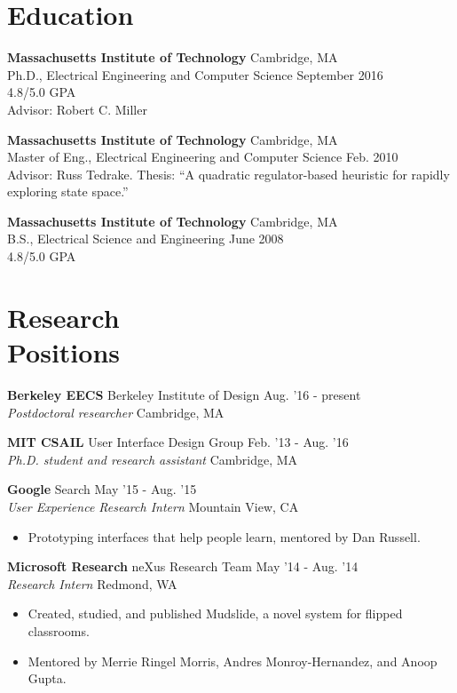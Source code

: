 \documentclass[margin]{res}
\begin{document}
\begin{resume}

\section{Education} 
{\bf Massachusetts Institute of Technology} \hfill Cambridge, MA \\
Ph.D., Electrical Engineering and Computer Science \hfill September 2016\\
4.8/5.0 GPA \\
Advisor: Robert C. Miller 

{\bf Massachusetts Institute of Technology} \hfill Cambridge, MA \\
Master of Eng., Electrical Engineering and Computer Science \hfill Feb. 2010 \\
Advisor: Russ Tedrake. Thesis: ``A quadratic regulator-based heuristic for rapidly exploring state space.''

{\bf Massachusetts Institute of Technology} \hfill Cambridge, MA \\
B.S., Electrical Science and Engineering \hfill June 2008 \\
4.8/5.0 GPA

\section{Research \\Positions}

{\bf Berkeley EECS} Berkeley Institute of Design \hfill Aug. '16 - present \\ 
{\it Postdoctoral researcher} \hfill Cambridge, MA 

{\bf MIT CSAIL} User Interface Design Group \hfill Feb. '13 - Aug. '16 \\ 
{\it Ph.D. student and research assistant} \hfill Cambridge, MA 

{\bf Google} Search \hfill May '15 - Aug. '15 \\ {\it User Experience Research Intern} \hfill Mountain View, CA 
 \begin{itemize} \itemsep -2pt  %
 \item Prototyping interfaces that help people learn, mentored by Dan Russell. 
\end{itemize}

{\bf Microsoft Research} neXus Research Team \hfill May '14 - Aug. '14 \\ {\it Research Intern} \hfill Redmond, WA 
 \begin{itemize} \itemsep -2pt  %
 \item Created, studied, and published Mudslide, a novel system for flipped classrooms.
\item Mentored by Merrie Ringel Morris, Andres Monroy-Hernandez, and Anoop Gupta. 
\end{itemize}


\end{resume}
\end{document}
